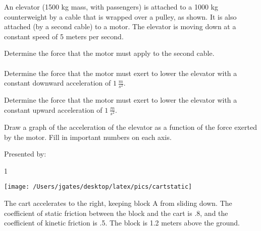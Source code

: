 {\bf \Large{}} An elevator (1500 kg mass, with passengers) is attached to a 1000 kg counterweight by a cable that is wrapped over a pulley, as shown.  It is also attached (by a second cable) to a motor.  The elevator is moving down at a constant speed of 5 meters per second.

\bigskip
Determine the force that the motor must apply to the second cable.
\paragraph{}
\noindent
\vfill
\vfill

Determine the force that the motor must exert to lower the elevator with a constant downward acceleration of ${1~\tfrac{m}{s^2}}$.

\vfill
\vfill
Determine the force that the motor must exert to lower the elevator with a constant upward acceleration of  ${1~\tfrac{m}{s^2}}$.

\vfill
Draw a graph of the acceleration of the elevator as a function of the force exerted by the motor.  Fill in important numbers on each axis.

\vfill
\vfill
\newpage

\AddToShipoutPicture*{\BackgroundPic}


\bigskip
{\large Presented by: }\underline{\hspace{5cm}}




\vfill
\newpage


\AddToShipoutPicture*{\BackgroundPic}

\addtocounter {ProbNum} {1}

\begin{floatingfigure}[r]{.2\textwidth}
\texttt{[image: /Users/jgates/desktop/latex/pics/cartstatic]}
\end{floatingfigure}
 
{\bf \Large{}} The cart accelerates to the right, keeping block A from sliding down. The coefficient of static friction between the block and the cart is .8, and the coefficient of kinetic friction is .5. The block is 1.2 meters above the ground.

